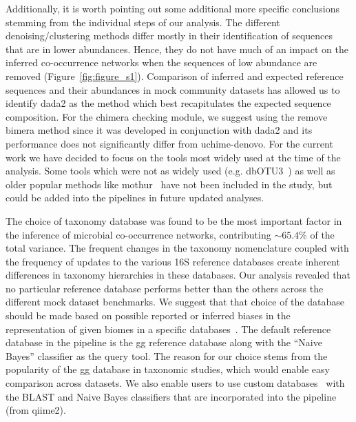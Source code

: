   Additionally, it is worth pointing out some additional more specific conclusions stemming from the individual steps of our analysis.
  The different denoising/clustering methods differ mostly in their identification of sequences that are in lower abundances.
  Hence, they do not have much of an impact on the inferred co-occurrence networks when the sequences of low abundance are removed (Figure~\ref{fig:figure_s1}).
  Comparison of inferred and expected reference sequences and their abundances in mock community datasets has allowed us to identify \ac{dada2} as the method which best recapitulates the expected sequence composition.
  For the chimera checking module, we suggest using the remove bimera method since it was developed in conjunction with \ac{dada2} and its performance does not significantly differ from uchime-denovo.
  For the current work we have decided to focus on the tools most widely used at the time of the analysis.
  Some tools which were not as widely used (e.g. dbOTU3~\cite{Olesen2017}) as well as older popular methods like mothur~\cite{Schloss2009} have not been included in the study, but could be added into the pipelines in future updated analyses.

  The choice of taxonomy database was found to be the most important factor in the inference of microbial co-occurrence networks, contributing $\sim65.4\%$ of the total variance.
  The frequent changes in the taxonomy nomenclature coupled with the frequency of updates to the various 16S reference databases create inherent differences \cite{Balvociute2017} in taxonomy hierarchies in these databases.
  Our analysis revealed that no particular reference database performs better than the others across the different mock dataset benchmarks.
  We suggest that that choice of the database should be made based on possible reported or inferred biases in the representation of given biomes in a specific databases~\cite{Balvociute2017}.
  The default reference database in the pipeline is the \ac{gg} reference database along with the ``Naive Bayes'' classifier as the query tool.
  The reason for our choice stems from the popularity of the \ac{gg} database in taxonomic studies, which would enable easy comparison across datasets.
  We also enable users to use custom databases~\cite{Ritari2015,iiRESCRIPtReproducibleSequence2021} with the BLAST and Naive Bayes classifiers that are incorporated into the pipeline (from \ac{qiime2}).

